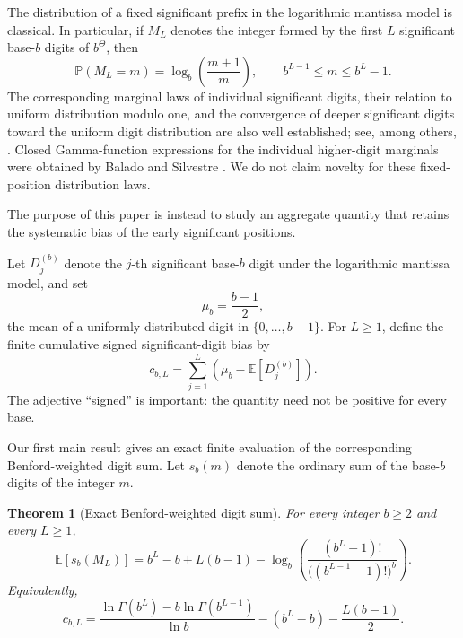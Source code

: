 \documentclass[11pt]{article}
\newtheorem{theorem}{Theorem}[section]
\theoremstyle{definition}
\theoremstyle{remark}
\begin{document}
The distribution of a fixed significant prefix in the logarithmic
mantissa model is classical.  In particular, if \(M_L\) denotes the
integer formed by the first \(L\) significant base-\(b\) digits of
\(b^\Theta\), then
\begin{equation}
    \mathbb P(M_L=m)
    =
    \log_b\!\left(\frac{m+1}{m}\right),
    \qquad
    b^{L-1}\le m\le b^L-1.
    \label{eq:classical-prefix-law-intro}
\end{equation}
The corresponding marginal laws of individual significant digits,
their relation to uniform distribution modulo one, and the convergence
of deeper significant digits toward the uniform digit distribution are
also well established; see, among others,
\cite{Newcomb1881,Benford1938,Diaconis1977,Hill1995Phenomenon,
Hill1995Statistical,BergerHill2011,BergerHill2015}.
Closed Gamma-function expressions for the individual higher-digit
marginals were obtained by Balado and Silvestre
\cite{BaladoSilvestre2021,BaladoSilvestre2024}.  We do not claim
novelty for these fixed-position distribution laws.

The purpose of this paper is instead to study an aggregate quantity that
retains the systematic bias of the early significant positions.

Let \(D_j^{(b)}\) denote the \(j\)-th significant base-\(b\) digit
under the logarithmic mantissa model, and set
\[
    \mu_b=\frac{b-1}{2},
\]
the mean of a uniformly distributed digit in
\(\{0,\ldots,b-1\}\).
For \(L\ge1\), define the finite cumulative signed significant-digit
bias by
\begin{equation}
    c_{b,L}
    =
    \sum_{j=1}^{L}
    \left(
        \mu_b-\mathbb E[D_j^{(b)}]
    \right).
    \label{eq:cbl-definition-intro}
\end{equation}
The adjective ``signed'' is important: the quantity need not be
positive for every base.

Our first main result gives an exact finite evaluation of the
corresponding Benford-weighted digit sum.  Let \(s_b(m)\) denote the
ordinary sum of the base-\(b\) digits of the integer \(m\).

\begin{theorem}[Exact Benford-weighted digit sum]
\label{thm:intro-finite-digit-sum}
For every integer \(b\ge2\) and every \(L\ge1\),
\begin{equation}
\boxed{
    \mathbb E[s_b(M_L)]
    =
    b^L-b+L(b-1)
    -
    \log_b
    \left(
        \frac{(b^L-1)!}
        {\bigl((b^{L-1}-1)!\bigr)^b}
    \right).
}
\label{eq:intro-finite-digit-sum}
\end{equation}
Equivalently,
\begin{equation}
\boxed{
    c_{b,L}
    =
    \frac{
        \ln\Gamma(b^L)
        -
        b\ln\Gamma(b^{L-1})
    }{\ln b}
    -
    (b^L-b)
    -
    \frac{L(b-1)}{2}.
}
\label{eq:intro-cbl-gamma}
\end{equation}
\end{theorem}
\end{document}
